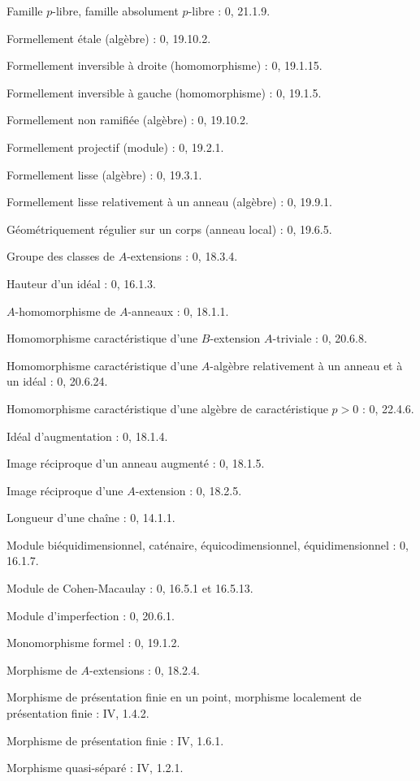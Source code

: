 Famille $p$-libre, famille absolument $p$-libre : 0, 21.1.9.\par
Formellement étale (algèbre) : 0, 19.10.2.\par
Formellement inversible à droite (homomorphisme) : 0, 19.1.15.\par
Formellement inversible à gauche (homomorphisme) : 0, 19.1.5.\par
Formellement non ramifiée (algèbre) : 0, 19.10.2.\par
Formellement projectif (module) : 0, 19.2.1.\par
Formellement lisse (algèbre) : 0, 19.3.1.\par
Formellement lisse relativement à un anneau (algèbre) : 0, 19.9.1.\par

Géométriquement régulier sur un corps (anneau local) : 0, 19.6.5.\par
Groupe des classes de $A$-extensions : 0, 18.3.4.\par

Hauteur d'un idéal : 0, 16.1.3.\par
$A$-homomorphisme de $A$-anneaux : 0, 18.1.1.\par
Homomorphisme caractéristique d'une $B$-extension $A$-triviale : 0, 20.6.8.\par
Homomorphisme caractéristique d'une $A$-algèbre relativement à un anneau et à un idéal : 0, 20.6.24.\par
Homomorphisme caractéristique d'une algèbre de caractéristique $p>0$ : 0, 22.4.6.\par

Idéal d'augmentation : 0, 18.1.4.\par
Image réciproque d'un anneau augmenté : 0, 18.1.5.\par
Image réciproque d'une $A$-extension : 0, 18.2.5.\par

Longueur d'une chaîne : 0, 14.1.1.\par

Module biéquidimensionnel, caténaire, équicodimensionnel, équidimensionnel : 0, 16.1.7.\par
Module de Cohen-Macaulay : 0, 16.5.1 et 16.5.13.\par
Module d'imperfection : 0, 20.6.1.\par
Monomorphisme formel : 0, 19.1.2.\par
Morphisme de $A$-extensions : 0, 18.2.4.\par
Morphisme de présentation finie en un point, morphisme localement de présentation finie : IV, 1.4.2.\par
Morphisme de présentation finie : IV, 1.6.1.\par
Morphisme quasi-séparé : IV, 1.2.1.\par

